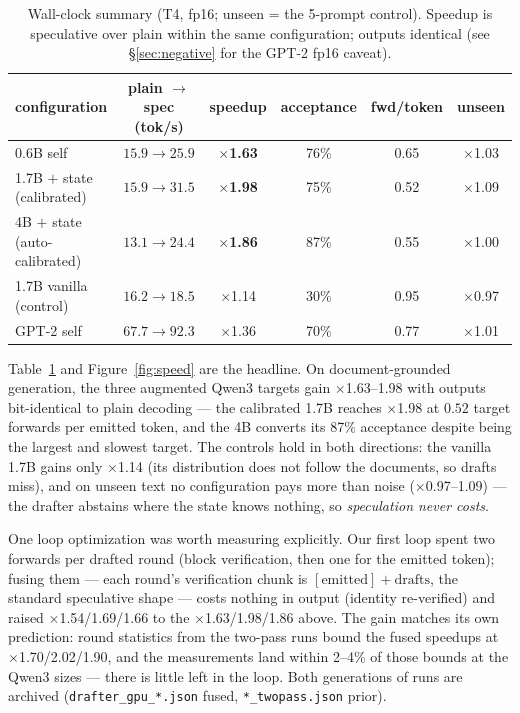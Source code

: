 \documentclass[11pt]{article}
\begin{document}
\begin{table}[t]
\centering\small
\caption{Wall-clock summary (T4, fp16; unseen = the 5-prompt control). Speedup is speculative over plain within the same configuration; outputs identical (see \S\ref{sec:negative} for the GPT-2 fp16 caveat).}
\label{tab:speed}
\begin{tabular}{@{}lccccc@{}}
\toprule
configuration & plain $\to$ spec (tok/s) & speedup & acceptance & fwd/token & unseen\\
\midrule
0.6B self & $15.9 \to 25.9$ & $\times$\textbf{1.63} & 76\% & 0.65 & $\times$1.03\\
1.7B $+$ state (calibrated) & $15.9 \to 31.5$ & $\times$\textbf{1.98} & 75\% & 0.52 & $\times$1.09\\
4B $+$ state (auto-calibrated) & $13.1 \to 24.4$ & $\times$\textbf{1.86} & 87\% & 0.55 & $\times$1.00\\
1.7B vanilla (control) & $16.2 \to 18.5$ & $\times$1.14 & 30\% & 0.95 & $\times$0.97\\
GPT-2 self & $67.7 \to 92.3$ & $\times$1.36 & 70\% & 0.77 & $\times$1.01\\
\bottomrule
\end{tabular}
\end{table}

Table~\ref{tab:speed} and Figure~\ref{fig:speed} are the headline. On document-grounded generation, the three augmented Qwen3 targets gain $\times$1.63--1.98 with outputs bit-identical to plain decoding --- the calibrated 1.7B reaches $\times$1.98 at $0.52$ target forwards per emitted token, and the 4B converts its 87\% acceptance despite being the largest and slowest target. The controls hold in both directions: the vanilla 1.7B gains only $\times$1.14 (its distribution does not follow the documents, so drafts miss), and on unseen text no configuration pays more than noise ($\times$0.97--1.09) --- the drafter abstains where the state knows nothing, so \emph{speculation never costs}.

One loop optimization was worth measuring explicitly. Our first loop spent two forwards per drafted round (block verification, then one for the emitted token); fusing them --- each round's verification chunk is $[\text{emitted}] + \text{drafts}$, the standard speculative shape --- costs nothing in output (identity re-verified) and raised $\times$1.54/1.69/1.66 to the $\times$1.63/1.98/1.86 above. The gain matches its own prediction: round statistics from the two-pass runs bound the fused speedups at $\times$1.70/2.02/1.90, and the measurements land within 2--4\% of those bounds at the Qwen3 sizes --- there is little left in the loop. Both generations of runs are archived (\texttt{drafter\_gpu\_*.json} fused, \texttt{*\_twopass.json} prior).
\end{document}

